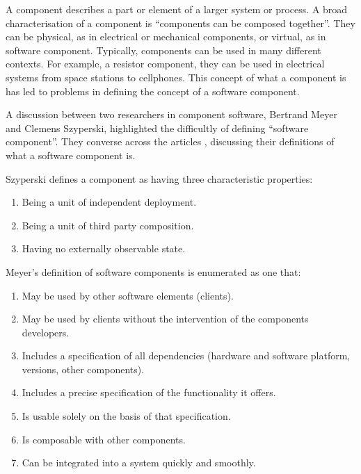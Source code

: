 A component describes a part or element of a larger system or process.
A broad characterisation of a component is ``components can be composed together''.
They can be physical, as in electrical or mechanical components, or virtual, as in software component.
Typically, components can be used in many different contexts.
For example, a resistor component, they can be used in electrical systems from space stations to cellphones.   
This concept of what a component is has led to problems in defining the concept of a software component.

A discussion between two researchers in component software, Bertrand Meyer and Clemens Szyperski, highlighted the difficultly of defining ``software component''. 
They converse across the articles \cite{Meyer1999,Szyperski2000a, Szyperski2000, Meyer2000}, discussing their definitions of what a software component is.

Szyperski defines a component \citep{Szyperski2002} as having three characteristic properties:
\begin{enumerate}
  \item Being a unit of independent deployment.
  \item Being a unit of third party composition.
  \item Having no externally observable state.
\end{enumerate}

Meyer's definition of software components is enumerated as one that:
\begin{enumerate}
  \item May be used by other software elements (clients).
  \item May be used by clients without the intervention of the components developers.
  \item Includes a specification of all dependencies (hardware and software platform, versions, other components).
  \item Includes a precise specification of the functionality it offers.
  \item Is usable solely on the basis of that specification.
  \item Is composable with other components.
  \item Can be integrated into a system quickly and smoothly.
\end{enumerate}

